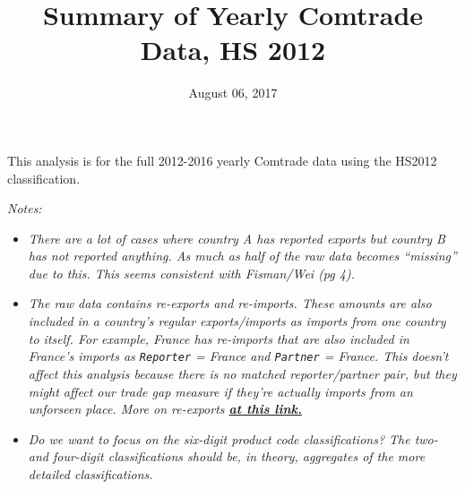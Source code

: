 \documentclass[10pt,]{article}
\title{Summary of Yearly Comtrade Data, HS 2012}
\author{}
\date{August 06, 2017}
\begin{document}
\maketitle

This analysis is for the full 2012-2016 yearly Comtrade data using the
HS2012 classification.

\emph{Notes:}

\begin{itemize}
\item
  \emph{There are a lot of cases where country A has reported exports
  but country B has not reported anything. As much as half of the raw
  data becomes ``missing'' due to this. This seems consistent with
  Fisman/Wei (pg 4).}
\item
  \emph{The raw data contains re-exports and re-imports. These amounts
  are also included in a country's regular exports/imports as imports
  from one country to itself. For example, France has re-imports that
  are also included in France's imports as \texttt{Reporter} = France
  and \texttt{Partner} = France. This doesn't affect this analysis
  because there is no matched reporter/partner pair, but they might
  affect our trade gap measure if they're actually imports from an
  unforseen place. More on re-exports
  \textbf{\href{https://unstats.un.org/unsd/tradekb/Knowledgebase/Reexports-and-Reimports}{at
  this link.}} }
\item
  \emph{Do we want to focus on the six-digit product code
  classifications? The two- and four-digit classifications should be, in
  theory, aggregates of the more detailed classifications.}
\end{itemize}
\end{document}
